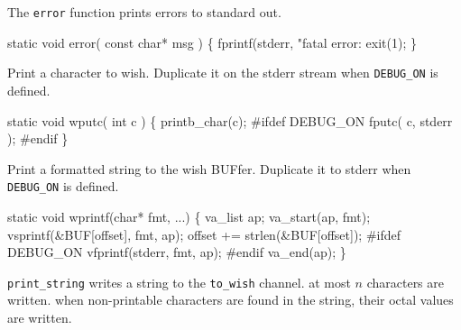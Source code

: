 The {\tt error} function prints errors to standard out.

\nwenddocs{}\endmoddef\let\nwnotused=\nwoutput{}
static void error( const char* msg )
\{
   fprintf(stderr, "fatal error: %
   exit(1);
\}
\nwendcode{}\nwdocspar


Print a character to wish. Duplicate it on
the stderr stream when {\tt DEBUG_ON} is defined.

\nwenddocs{}\endmoddef\let\nwnotused=\nwoutput{}
static void wputc( int c )
\{
   printb_char(c);
   #ifdef DEBUG_ON
      fputc( c, stderr );
   #endif
\}
\nwendcode{}\nwdocspar


Print a formatted string to the wish BUFfer. Duplicate it to stderr
when {\tt DEBUG_ON} is defined.

\nwenddocs{}\endmoddef\let\nwnotused=\nwoutput{}
static void wprintf(char* fmt, ...)
\{
  va_list ap;
  va_start(ap, fmt);
  vsprintf(&BUF[offset], fmt, ap);
  offset += strlen(&BUF[offset]);
  #ifdef DEBUG_ON
    vfprintf(stderr, fmt, ap);
  #endif
  va_end(ap);
\}
\nwendcode{}\nwdocspar


{\tt print_string} writes a string to the {\tt to\_wish} channel. 
at most $n$ characters are written.
when non-printable characters are found in the string,
their octal values are written.

